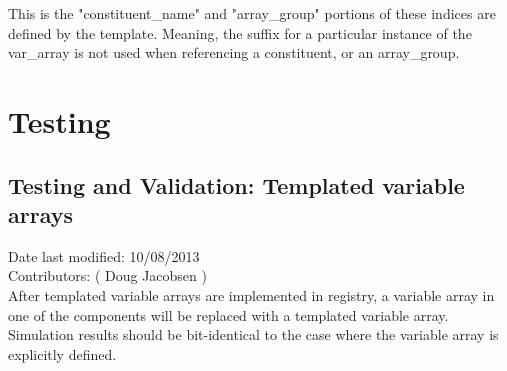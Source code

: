 \documentclass[11pt]{report}
\begin{document}
This is the "constituent\_name" and "array\_group" portions of these indices
are defined by the template. Meaning, the suffix for a particular instance of
the var\_array is not used when referencing a constituent, or an array\_group.


\chapter{Testing}

\section{Testing and Validation: Templated variable arrays}
Date last modified: 10/08/2013 \\
Contributors: ( Doug Jacobsen ) \\

After templated variable arrays are implemented in registry, a variable array
in one of the components will be replaced with a templated variable array.
Simulation results should be bit-identical to the case where the variable array
is explicitly defined.

\end{document}
